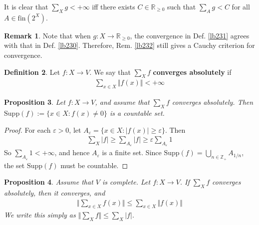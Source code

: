 \documentclass[12pt,b5paper,notitlepage]{article}
\theoremstyle{definition}
\newtheorem{df}{Definition}[subsection]
\newtheorem{rem}[df]{Remark}
\theoremstyle{plain}
\newtheorem{pp}[df]{Proposition}
\newcommand{\Zbb}{\mathbb Z}
\newcommand{\Rbb}{\mathbb R}
\newcommand{\fin}{\mathrm{fin}}
\newcommand{\Supp}{\mathrm{Supp}}
\newcommand{\eps}{\varepsilon}
\numberwithin{equation}{section}
\begin{document}
It is clear that $\sum_Xg<+\infty$ iff there exists $C\in\Rbb_{\geq0}$ such that $\sum_Ag<C$ for all $A\in\fin(2^X)$.


\begin{rem}
Note that when $g:X\rightarrow\Rbb_{\geq0}$, the convergence in Def. \ref{lb231} agrees with that in Def. \ref{lb230}. Therefore, Rem. \ref{lb232} still gives a Cauchy criterion for convergence.
\end{rem}



\begin{df}
Let $f:X\rightarrow V$. We say that $\sum_Xf$ \textbf{converges absolutely}  if 
\begin{align*}
\sum_{x\in X}\Vert f(x)\Vert<+\infty
\end{align*}
\end{df}

\begin{pp}\label{lb235}
Let $f:X\rightarrow V$, and assume that $\sum_Xf$ converges absolutely. Then $\Supp(f):=\{x\in X:f(x)\neq0\}$ is a countable set.
\end{pp}

\begin{proof}
For each $\eps>0$, let $A_\eps=\{x\in X:|f(x)|\geq \eps\}$. Then
\begin{align*}
\sum_X|f|\geq\sum_{A_\eps}|f|\geq\eps\sum_{A_\eps}1
\end{align*}
So $\sum_{A_\eps}1<+\infty$, and hence $A_\eps$ is a finite set. Since $\Supp(f)=\bigcup_{n\in\Zbb_+}A_{1/n}$, the set $\Supp(f)$ must be countable.
\end{proof}





\begin{pp}\label{lb234}
Assume that $V$ is complete. Let $f:X\rightarrow V$. If  $\sum_Xf$ converges absolutely, then it converges, and
\begin{align}\label{eq130}
\Big\Vert \sum_{x\in X} f(x) \Big\Vert\leq\sum_{x\in X} \Vert f(x)\Vert 
\end{align}
We write this simply as $\Vert\sum_X f\Vert\leq\sum_X |f|$.
\end{pp}
\end{document}
